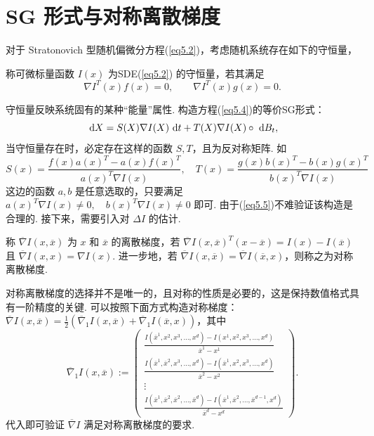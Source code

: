 \section{SG 形式与对称离散梯度}
对于 Stratonovich 型随机偏微分方程(\ref{eq5.2})，考虑随机系统存在如下的守恒量，
\begin{definition}[守恒量]
	称可微标量函数 $I(x)$ 为SDE(\ref{eq5.2}) 的守恒量，若其满足
	\begin{equation}\label{eq5.5}
		\nabla I^T(x) f(x) = 0,\qquad \nabla I^T(x) g(x) = 0.
	\end{equation}
\end{definition}
守恒量反映系统固有的某种“能量”属性. 构造方程(\ref{eq5.4})的等价SG形式：
\begin{equation}\label{eq_SG}
	\text{ d} X = S(X) \nabla I(X) \text{ d} t +  T(X) \nabla I(X) \circ \text{ d} B_t,
\end{equation}
当守恒量存在时，必定存在这样的函数 $S,T$，且为反对称矩阵. 如
\begin{equation}
	S(x)=\frac{f(x) a(x)^{T}-a(x) f(x)^{T}}{a(x)^{T} \nabla I(x)}, \quad T(x)=\frac{g(x) b(x)^{T}-b(x) g(x)^{T}}{b(x)^{T} \nabla I(x)}
\end{equation}
这边的函数 $a,b$ 是任意选取的，只要满足 $a(x)^T \nabla I(x)\neq 0,\quad b(x)^T \nabla I(x) \neq 0 $ 即可. 由于(\ref{eq5.5})不难验证该构造是合理的. 接下来，需要引入对 $\Delta I$ 的估计.
\begin{definition}
	称 $\overline{\nabla} I(x,\overline{ x })$ 为 $x$ 和 $\overline x$ 的离散梯度，若 $\overline \nabla I(x,\overline x) ^ T (x - \overline x) = I(x) - I(\overline x)$  且 $\overline \nabla I(x,x) = \nabla I(x)$. 进一步地，若 $\overline \nabla I(x,\overline x) = \overline \nabla I(\overline x,x)$，则称之为对称离散梯度.
\end{definition}

对称离散梯度的选择并不是唯一的，且对称的性质是必要的，这是保持数值格式具有一阶精度的关键. 可以按照下面方式构造对称梯度：$ \overline \nabla I(x,\overline x) = \frac12( \overline \nabla_1 I(x,\overline x) +  \overline \nabla_1 I(\overline x,x)  ) $，其中
\[
\overline{\nabla}_1 I(x, \overline{x}):=
\left(\begin{array}{c}
\frac{I\left(\overline{x}^{1}, x^{2}, x^{3}, \ldots, x^{d}\right)-I\left(x^{1}, x^{2}, x^{3}, \ldots, x^{d}\right)}{\overline{x}^{1}-x^{1}} \\
\frac{I\left(\overline{x}^{1}, \overline{x}^{2}, x^{3}, \ldots, x^{d}\right)-I\left(\overline{x}^{1}, x^2, x^3, \ldots, x^d\right)}{\overline{x}^{2}-x^{2}} \\
\vdots \\
\frac{I\left(\overline{x}^{1}, \overline{x}^2, \overline{x}^2, \ldots, \overline{x}^{d}\right)-I\left(\overline{x}^1, \overline{x}^2, \ldots, \overline{x}^{d-1}, x^{d}\right)}{\overline{x}^d-x^d}
\end{array}\right) .
\]
代入即可验证 $\overline \nabla I$ 满足对称离散梯度的要求. 





